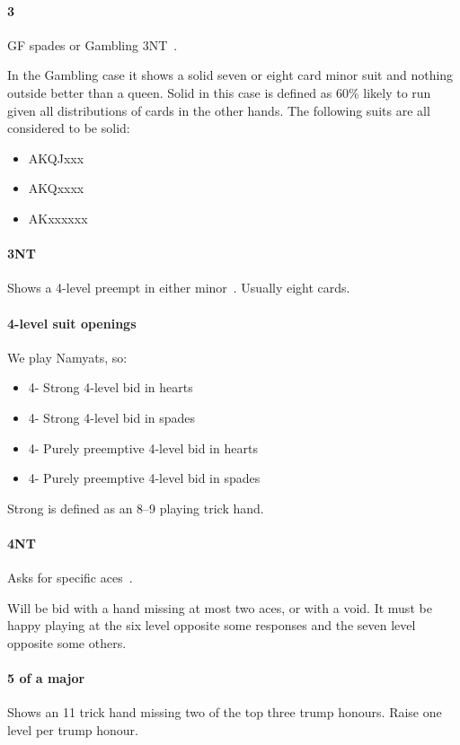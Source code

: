 \paragraph{3\spades}

GF spades or Gambling 3NT~. 

In the Gambling case it shows a solid seven or eight card minor suit and nothing outside better than a
queen.  Solid in this case is defined as 60\% likely to run given all
distributions of cards in the other hands. The following suits are all
considered to be solid:

\begin{itemize}
\item AKQJxxx
\item AKQxxxx
\item AKxxxxxx
\end{itemize}

\paragraph{3NT}

Shows a 4-level preempt in either minor~. Usually eight cards. 

\paragraph{4-level suit openings}

We play Namyats, so:

\begin{itemize}
\item 4\clubs - Strong 4-level bid in hearts~
\item 4\diamonds - Strong 4-level bid in spades~
\item 4\hearts - Purely preemptive 4-level bid in hearts
\item 4\spades - Purely preemptive 4-level bid in spades
\end{itemize}

Strong is defined as an 8--9 playing trick hand.

\paragraph{4NT}

Asks for specific aces~.

Will be bid with a hand missing at most two aces, or with a void. It must be happy playing at the six level opposite some responses and the seven level opposite some others.

\paragraph{5 of a major}

Shows an 11 trick hand missing two of the top three trump honours. Raise one level per trump honour.


